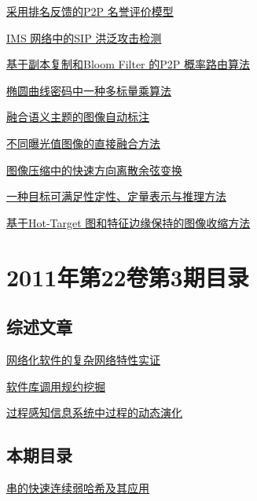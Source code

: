 \documentclass[a4paper]{article}
\begin{document}
\href{http://www.jos.org.cn/ch/reader/download_pdf.aspx?file_no=3754&year_id=2011&quarter_id=4&falg=1}{采用排名反馈的P2P 名誉评价模型}

\href{http://www.jos.org.cn/ch/reader/download_pdf.aspx?file_no=3818&year_id=2011&quarter_id=4&falg=1}{IMS 网络中的SIP 洪泛攻击检测}

\href{http://www.jos.org.cn/ch/reader/download_pdf.aspx?file_no=3757&year_id=2011&quarter_id=4&falg=1}{基于副本复制和Bloom Filter 的P2P 概率路由算法}

\href{http://www.jos.org.cn/ch/reader/download_pdf.aspx?file_no=3730&year_id=2011&quarter_id=4&falg=1}{椭圆曲线密码中一种多标量乘算法}

\href{http://www.jos.org.cn/ch/reader/download_pdf.aspx?file_no=3742&year_id=2011&quarter_id=4&falg=1}{融合语义主题的图像自动标注}

\href{http://www.jos.org.cn/ch/reader/download_pdf.aspx?file_no=3795&year_id=2011&quarter_id=4&falg=1}{不同曝光值图像的直接融合方法}

\href{http://www.jos.org.cn/ch/reader/download_pdf.aspx?file_no=3805&year_id=2011&quarter_id=4&falg=1}{图像压缩中的快速方向离散余弦变换}

\href{http://www.jos.org.cn/ch/reader/download_pdf.aspx?file_no=3736&year_id=2011&quarter_id=4&falg=1}{一种目标可满足性定性、定量表示与推理方法}

\href{http://www.jos.org.cn/ch/reader/download_pdf.aspx?file_no=3824&year_id=2011&quarter_id=4&falg=1}{基于Hot-Target 图和特征边缘保持的图像收缩方法}


\section{\textbf{2011年第22卷第3期目录}}
\subsection{综述文章}
\href{http://www.jos.org.cn/ch/reader/download_pdf.aspx?file_no=3934&year_id=2011&quarter_id=3&falg=1}{网络化软件的复杂网络特性实证}

\href{http://www.jos.org.cn/ch/reader/download_pdf.aspx?file_no=3931&year_id=2011&quarter_id=3&falg=1}{软件库调用规约挖掘}

\href{http://www.jos.org.cn/ch/reader/download_pdf.aspx?file_no=3962&year_id=2011&quarter_id=3&falg=1}{过程感知信息系统中过程的动态演化}

\subsection{本期目录}
\href{http://www.jos.org.cn/ch/reader/download_pdf.aspx?file_no=3867&year_id=2011&quarter_id=3&falg=1}{串的快速连续弱哈希及其应用}
\end{document}
